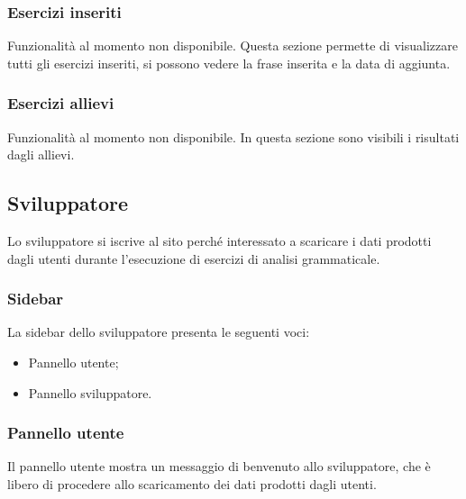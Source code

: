         
        
        \subsubsection{Esercizi inseriti}
        
        Funzionalità al momento non disponibile. Questa sezione permette di visualizzare tutti gli esercizi inseriti, si possono vedere la frase inserita e la data di aggiunta.
        
        
        
        
        \subsubsection{Esercizi allievi}        
         Funzionalità al momento non disponibile. In questa sezione sono visibili i risultati dagli allievi.
        
        
        
        
	\newpage
    \subsection{Sviluppatore}
    Lo sviluppatore si iscrive al sito perché interessato a scaricare i dati prodotti dagli utenti durante l'esecuzione di esercizi di analisi grammaticale.
    	\subsubsection{Sidebar} 
    	  La sidebar dello sviluppatore presenta le seguenti voci:
    		\begin{itemize}
    			\item Pannello utente;
    			\item Pannello sviluppatore.
    		\end{itemize}
    
    
    
    
    	\subsubsection{Pannello utente}
    	  Il pannello utente mostra un messaggio di benvenuto allo sviluppatore, che è libero di procedere allo scaricamento dei dati prodotti dagli utenti.



